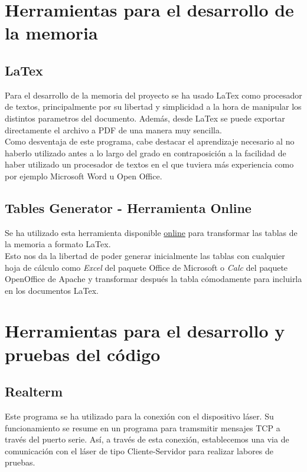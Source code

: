 

\section{Herramientas para el desarrollo de la memoria}

\subsection{LaTex}
Para el desarrollo de la memoria del proyecto se ha usado LaTex como procesador de textos, principalmente por su libertad y simplicidad a la hora de manipular los distintos parametros del documento. Además, desde LaTex se puede exportar directamente el archivo a PDF de una manera muy sencilla.\\
Como desventaja de este programa, cabe destacar el aprendizaje necesario al no haberlo utilizado antes a lo largo del grado en contraposición a la facilidad de haber utilizado un procesador de textos en el que tuviera más experiencia como por ejemplo Microsoft Word u Open Office.
\subsection{Tables Generator - Herramienta Online}
Se ha utilizado esta herramienta disponible \href{https://www.tablesgenerator.com/latex_tables#}{online} para transformar las tablas de la memoria a formato LaTex. \\
Esto nos da la libertad de poder generar inicialmente las tablas con cualquier hoja de cálculo como \emph{Excel} del paquete Office de Microsoft o \emph{Calc} del paquete OpenOffice de Apache y transformar después la tabla cómodamente para incluirla en los documentos LaTex.

\section{Herramientas para el desarrollo y pruebas del código}

\subsection{Realterm}
Este programa se ha utilizado para la conexión con el dispositivo láser. Su funcionamiento se resume en un programa para tramsmitir mensajes TCP a través del puerto serie. Así, a través de esta conexión, establecemos una via de comunicación con el láser de tipo Cliente-Servidor para realizar labores de pruebas.

